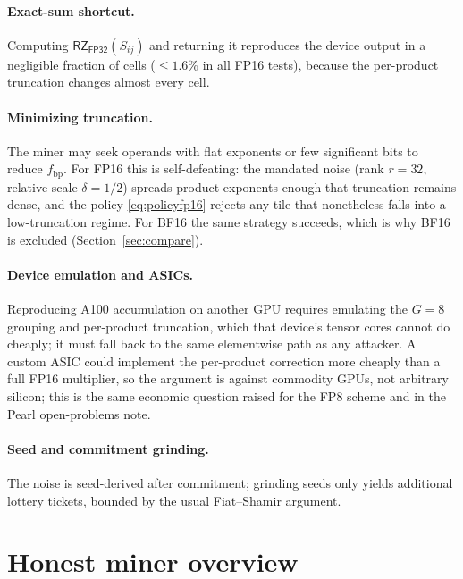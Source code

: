 \documentclass[11pt]{article}
\newcommand{\RZ}{\textsf{RZ}}
\newcommand{\FP}[1]{\textsf{FP#1}}
\begin{document}
\paragraph{Exact-sum shortcut.} Computing $\RZ_{\FP{32}}(S_{ij})$ and returning it reproduces the
device output in a negligible fraction of cells ($\le 1.6\%$ in all \FP{16} tests), because the
per-product truncation changes almost every cell.

\paragraph{Minimizing truncation.} The miner may seek operands with flat exponents or few
significant bits to reduce $f_{\text{bp}}$. For \FP{16} this is self-defeating: the mandated noise
(rank $r=32$, relative scale $\delta=1/2$) spreads product exponents enough that truncation
remains dense, and the policy \eqref{eq:policyfp16} rejects any tile that nonetheless falls into a
low-truncation regime. For \textsf{BF16} the same strategy succeeds, which is why \textsf{BF16} is
excluded (Section~\ref{sec:compare}).

\paragraph{Device emulation and ASICs.} Reproducing A100 accumulation on another GPU requires
emulating the $G=8$ grouping and per-product truncation, which that device's tensor cores cannot
do cheaply; it must fall back to the same elementwise path as any attacker. A custom ASIC could
implement the per-product correction more cheaply than a full \FP{16} multiplier, so the argument
is against commodity GPUs, not arbitrary silicon; this is the same economic question raised
for the \FP{8} scheme and in the Pearl open-problems note.

\paragraph{Seed and commitment grinding.} The noise is seed-derived after commitment; grinding
seeds only yields additional lottery tickets, bounded by the usual Fiat--Shamir argument.

\section{Honest miner overview}\label{sec:miner}
\end{document}
